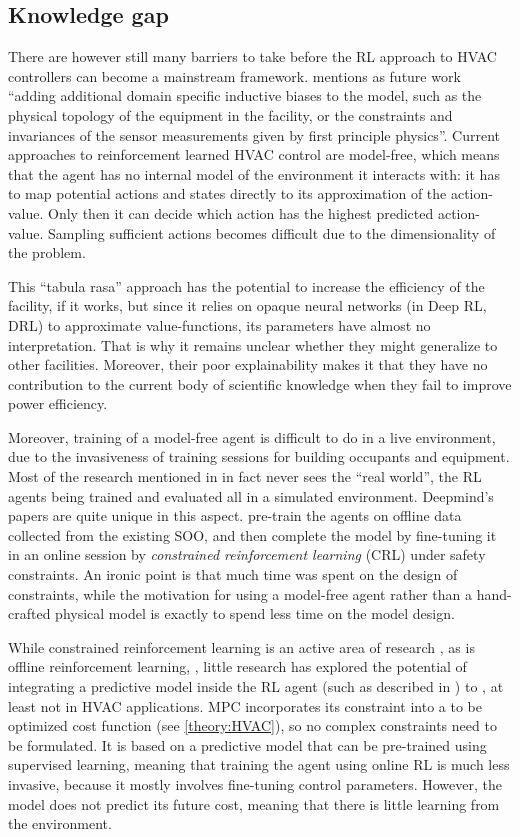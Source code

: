 \documentclass{article}
\theoremstyle{definition}
\theoremstyle{remark}
\begin{document}
\subsection{Knowledge gap}
There are however still many barriers to take before the RL approach to HVAC controllers can become a mainstream framework. \cite{luo2022controlling} mentions as future work ``adding additional domain specific inductive biases to the model, such as the physical topology of the equipment in the facility, or the constraints and invariances of the sensor measurements given by first principle physics''. Current approaches to reinforcement learned HVAC control are model-free, which means that the agent has no internal model of the environment it interacts with: it has to map potential actions and states directly to its approximation of the action-value. Only then it can decide which action has the highest predicted action-value. Sampling sufficient actions becomes difficult due to the dimensionality of the problem.

This ``tabula rasa'' approach has the potential to increase the efficiency of the facility, if it works, but since it relies on opaque neural networks (in Deep RL, DRL) to approximate value-functions, its parameters have almost no interpretation. That is why it remains unclear whether they might generalize to other facilities. Moreover, their poor explainability makes it that they have no contribution to the current body of scientific knowledge when they fail to improve power efficiency.

Moreover, training of a model-free agent is difficult to do in a live environment, due to the invasiveness of training sessions for building occupants and equipment. Most of the research mentioned in \cite{Yuetal} in fact never sees the ``real world'', the RL agents being trained and evaluated all in a simulated environment. Deepmind's papers are quite unique in this aspect. \cite{evans_gao_2016, gamble_gao_2018, luo2022controlling} pre-train the agents on offline data collected from the existing SOO, and then complete the model by fine-tuning it in an online session by \textit{constrained reinforcement learning} (CRL) under safety constraints. An ironic point is that much time was spent on the design of constraints, while the motivation for using a model-free agent rather than a hand-crafted physical model is exactly to spend less time on the model design.

While constrained reinforcement learning is an active area of research \cite{agarwal2020optimistic}, as is offline reinforcement learning, \cite{levine2020offline}, little research has explored the potential of integrating a predictive model inside the RL agent (such as described in \cite{Seita_2019}) to , at least not in HVAC applications. MPC incorporates its constraint into a to be optimized cost function (see \ref{theory:HVAC}), so no complex constraints need to be formulated. It is based on a predictive model that can be pre-trained using supervised learning, meaning that training the agent using online RL is much less invasive, because it mostly involves fine-tuning control parameters. However, the model does not predict its future cost, meaning that there is little learning from the environment.
\end{document}
